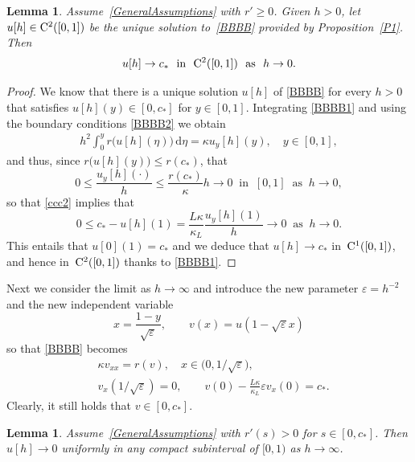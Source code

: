 \documentclass[reqno,11pt]{amsart}
\newtheorem{lem}[thm]{Lemma}
\numberwithin{equation}{section}
\newcommand{\rd}{\mathrm{d}}
\begin{document}
\begin{lem}\label{h=0}
Assume~\eqref{GeneralAssumptions} with $r'\ge 0$. Given $h>0$, let $u[h]\in 
{\rm C}^2([0,1])$ be the unique solution to~\eqref{BBBB}
provided by Proposition~\ref{P1}. Then
$$
u[h]\to c_*\  \text{ in }\ {\rm C}^2([0,1])\ \text{ as }\ h\to 0.
$$
\end{lem}
\begin{proof}
We know that there is a unique solution $u[h]$ of
\eqref{BBBB} for every $h>0$ that satisfies
$u[h](y)\in[0,c_*]$ for $y\in [0,1]$. Integrating \eqref{BBBB1} and
using the boundary conditions \eqref{BBBB2} we obtain
\begin{align}\label{t1}
  h^2\int_0^y r\big(u[h](\eta)\big)\,\rd \eta=
  \kappa u_y[h](y),\quad y\in[0,1],
\end{align}
and thus, since $r\big(u[h](y)\big)\leq r(c_*)$, that
$$
0\leq \frac{u_y[h](\cdot)}{h}\leq\frac{r(c_*)}{\kappa}h\to 0
\ \text{ in }\ [0,1] \ \text{ as }\ h\to 0,
$$
so that \eqref{ccc2} implies that
$$
0\leq
c_*-u[h](1)=\frac{L\kappa}{\kappa_L}\frac{u_y[h](1)}{h}\to 0\
\text{ as }\ h\to 0.
$$
This entails that $u[0](1)=c_*$ and we deduce that $u[h]\to c_*$
in~${\rm C}^1([0,1])$, and hence in~${\rm C}^2([0,1])$ thanks to
\eqref{BBBB1}.
\end{proof}
Next we consider the limit as $h\to\infty$ and introduce the new
parameter $\varepsilon=h^{-2}$ and the new independent variable
$$
x=\frac{1-y}{\sqrt{\varepsilon}},\qquad
v(x)=u\left(1-\sqrt{\varepsilon}x\right) 
$$
so that \eqref{BBBB}
becomes
\begin{align*}
  &\kappa  v_{xx}=r(v), \quad
    x\in\bigl(0,1/\sqrt{\varepsilon}\bigr),\\ 
  &v_x(1/\sqrt{\varepsilon})=0,\qquad
  v(0)-\frac{L\kappa}{\kappa_L}\varepsilon v_x(0)=c_*.
\end{align*}
Clearly, it still holds that $v\in[0,c_*]$.  


\begin{lem}\label{h=infty}
Assume~\eqref{GeneralAssumptions} with $r'(s)>0$ for $s\in [0,c_*]$.
Then  $u[h]\to 0$  uniformly  
in any compact subinterval of $[0,1)$ as $h\to\infty$. 
\end{lem}
\end{document}
